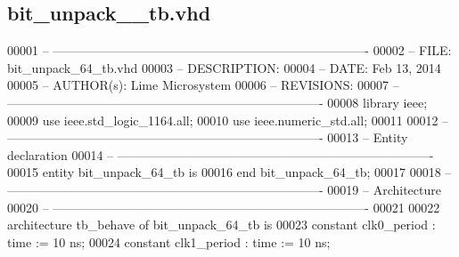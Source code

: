 \subsection{bit\+\_\+unpack\+\_\+\_\+tb.\+vhd}
\label{bit__unpack__64__tb_8vhd_source}

\begin{DoxyCode}
00001 \textcolor{keyword}{-- ---------------------------------------------------------------------------- }
00002 \textcolor{keyword}{-- FILE:    bit\_unpack\_64\_tb.vhd}
00003 \textcolor{keyword}{-- DESCRIPTION: }
00004 \textcolor{keyword}{-- DATE:    Feb 13, 2014}
00005 \textcolor{keyword}{-- AUTHOR(s):   Lime Microsystem}
00006 \textcolor{keyword}{-- REVISIONS:}
00007 \textcolor{keyword}{-- ---------------------------------------------------------------------------- }
00008 \textcolor{vhdlkeyword}{library }\textcolor{keywordflow}{ieee};
00009 \textcolor{vhdlkeyword}{use }ieee.std\_logic\_1164.\textcolor{keywordflow}{all};
00010 \textcolor{vhdlkeyword}{use }ieee.numeric\_std.\textcolor{keywordflow}{all};
00011 
00012 \textcolor{keyword}{-- ----------------------------------------------------------------------------}
00013 \textcolor{keyword}{-- Entity declaration}
00014 \textcolor{keyword}{-- ----------------------------------------------------------------------------}
00015 \textcolor{keywordflow}{entity }bit_unpack_64_tb \textcolor{keywordflow}{is}
00016 \textcolor{keywordflow}{end} \textcolor{vhdlchar}{bit\_unpack\_64\_tb};
00017 
00018 \textcolor{keyword}{-- ----------------------------------------------------------------------------}
00019 \textcolor{keyword}{-- Architecture}
00020 \textcolor{keyword}{-- ----------------------------------------------------------------------------}
00021 
00022 \textcolor{keywordflow}{architecture} tb\_behave \textcolor{keywordflow}{of} bit_unpack_64_tb is
00023    \textcolor{keywordflow}{constant} \textcolor{vhdlchar}{clk0_period}   \textcolor{vhdlchar}{:} \textcolor{comment}{time} \textcolor{vhdlchar}{:=} \textcolor{vhdllogic}{}\textcolor{vhdllogic}{10} \textcolor{vhdlchar}{ns};
00024    \textcolor{keywordflow}{constant} \textcolor{vhdlchar}{clk1_period}   \textcolor{vhdlchar}{:} \textcolor{comment}{time} \textcolor{vhdlchar}{:=} \textcolor{vhdllogic}{}\textcolor{vhdllogic}{10} \textcolor{vhdlchar}{ns}; 

\end{DoxyCode}
